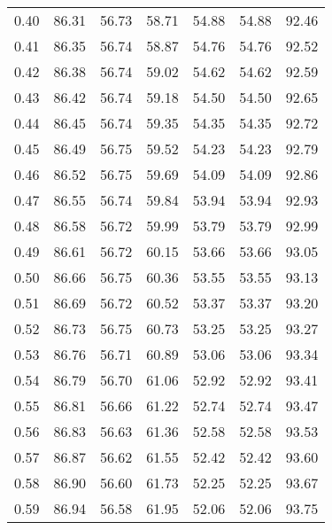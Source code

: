 \begin{tabular}{|c|c|c|c|c|c|c|}
      0.40 &     86.31 &     56.73 &      58.71 &   54.88 &      54.88 &         92.46 \\
      0.41 &     86.35 &     56.74 &      58.87 &   54.76 &      54.76 &         92.52 \\
      0.42 &     86.38 &     56.74 &      59.02 &   54.62 &      54.62 &         92.59 \\
      0.43 &     86.42 &     56.74 &      59.18 &   54.50 &      54.50 &         92.65 \\
      0.44 &     86.45 &     56.74 &      59.35 &   54.35 &      54.35 &         92.72 \\
      0.45 &     86.49 &     56.75 &      59.52 &   54.23 &      54.23 &         92.79 \\
      0.46 &     86.52 &     56.75 &      59.69 &   54.09 &      54.09 &         92.86 \\
      0.47 &     86.55 &     56.74 &      59.84 &   53.94 &      53.94 &         92.93 \\
      0.48 &     86.58 &     56.72 &      59.99 &   53.79 &      53.79 &         92.99 \\
      0.49 &     86.61 &     56.72 &      60.15 &   53.66 &      53.66 &         93.05 \\
      0.50 &     86.66 &     56.75 &      60.36 &   53.55 &      53.55 &         93.13 \\
      0.51 &     86.69 &     56.72 &      60.52 &   53.37 &      53.37 &         93.20 \\
      0.52 &     86.73 &     56.75 &      60.73 &   53.25 &      53.25 &         93.27 \\
      0.53 &     86.76 &     56.71 &      60.89 &   53.06 &      53.06 &         93.34 \\
      0.54 &     86.79 &     56.70 &      61.06 &   52.92 &      52.92 &         93.41 \\
      0.55 &     86.81 &     56.66 &      61.22 &   52.74 &      52.74 &         93.47 \\
      0.56 &     86.83 &     56.63 &      61.36 &   52.58 &      52.58 &         93.53 \\
      0.57 &     86.87 &     56.62 &      61.55 &   52.42 &      52.42 &         93.60 \\
      0.58 &     86.90 &     56.60 &      61.73 &   52.25 &      52.25 &         93.67 \\
      0.59 &     86.94 &     56.58 &      61.95 &   52.06 &      52.06 &         93.75 \\

\end{tabular}
